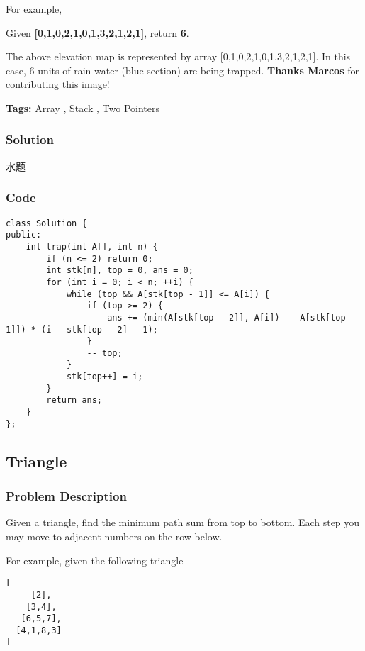 \documentclass{article}
\begin{document}
\begin{CJK*}{UTF8}{gkai}
For example, 


Given \textbf{[0,1,0,2,1,0,1,3,2,1,2,1]}, return \textbf{6}.

The above elevation map is represented by array [0,1,0,2,1,0,1,3,2,1,2,1]. In this case, 6 units of rain water (blue section) are being trapped. \textbf{Thanks Marcos} for contributing this image!


\textbf{Tags: }
\hyperref[ Array ]{ Array },  \hyperref[ Stack ]{ Stack },  \hyperref[ Two Pointers ]{ Two Pointers }



\subsubsection*{Solution}
水题

\subsubsection*{Code}
\begin{lstlisting}
class Solution {
public:
    int trap(int A[], int n) {
        if (n <= 2) return 0;
        int stk[n], top = 0, ans = 0;
        for (int i = 0; i < n; ++i) {
            while (top && A[stk[top - 1]] <= A[i]) {
                if (top >= 2) {
                    ans += (min(A[stk[top - 2]], A[i])  - A[stk[top - 1]]) * (i - stk[top - 2] - 1);
                }
                -- top;
            }
            stk[top++] = i;
        }
        return ans;
    }
}; 
\end{lstlisting}


\subsection{ Triangle }
\label{ Triangle }

\subsubsection*{Problem Description}
Given a triangle, find the minimum path sum from top to bottom. Each step you may move to adjacent numbers on the row below.

For example, given the following triangle


\begin{verbatim}
[
     [2],
    [3,4],
   [6,5,7],
  [4,1,8,3]
]
\end{verbatim}


\end{CJK*}
\end{document}
